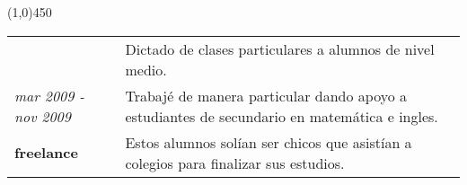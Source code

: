 \begin{center}
\line(1,0){450}
\end{center}
\noindent
\begin{tabular}{C{5cm}|p{11cm}}
& \large Dictado de clases particulares a alumnos de nivel medio.\\
\large\textit{mar 2009 - nov 2009} & \large Trabajé de manera particular dando apoyo a estudiantes de secundario en
matemática e ingles. \\
\large\textbf{freelance} & \large Estos alumnos solían ser chicos que asistían a colegios para finalizar sus
estudios.
\end{tabular}


